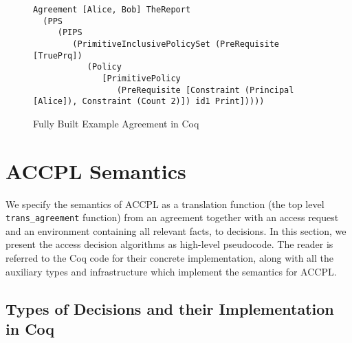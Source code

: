 \documentclass[conference]{IEEEtran}
\newcommand{\syn}{\texttt}
\begin{document}
\lstset{language=Coq, captionpos=b} 
\begin{figure*}
\begin{lstlisting}
Agreement [Alice, Bob] TheReport
  (PPS
     (PIPS
        (PrimitiveInclusivePolicySet (PreRequisite [TruePrq])
           (Policy
              [PrimitivePolicy
                 (PreRequisite [Constraint (Principal [Alice]), Constraint (Count 2)]) id1 Print]))))
\end{lstlisting}
\caption{Fully Built Example Agreement in Coq}
\label{fig:agreementincoq2}
\end{figure*}

\section{ACCPL Semantics}
We specify the semantics of \ac{ACCPL} as a translation function (the top level \syn{trans_agreement} function) from
an agreement together with an access request and an environment
containing all relevant facts, to decisions. In this section, we
present the access decision algorithms as high-level pseudocode. The reader is
referred to the Coq code for their concrete implementation, along with all the
auxiliary types and infrastructure which implement the semantics for
\ac{ACCPL}.


\subsection{Types of Decisions and their Implementation in Coq}\label{sec:answerandresulttypes}
\end{document}
